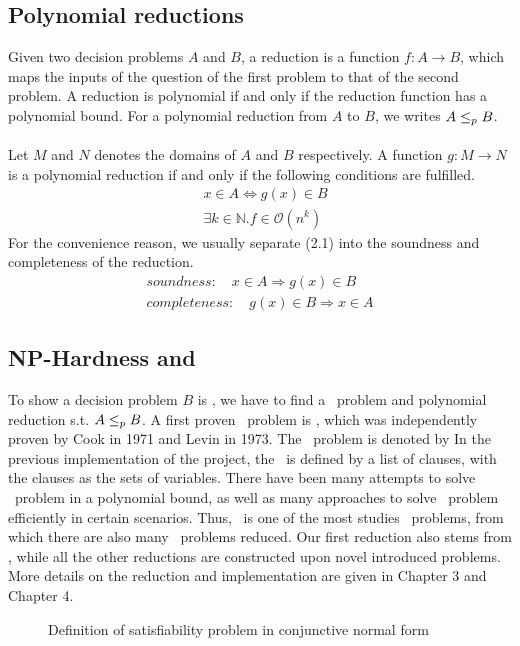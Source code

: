 \subsection{Polynomial reductions}
Given two decision problems $A$ and $B$, 
a reduction is a function $f: A \rightarrow B$, 
which maps the inputs of the question of the first problem 
to that of the second problem. A reduction is polynomial 
if and only if the reduction function has a polynomial bound. 
For a polynomial reduction from $A$ to $B$, we writes $A \leq_p B$. \\ \\
Let $M$ and $N$ denotes the domains of $A$ and $B$ respectively. 
A function $g: M \rightarrow N$ is a polynomial reduction 
if and only if the following conditions are fulfilled.
\begin{align}  
    &x \in A \iff g(x) \in B \\
    &\exists k\in \mathbb{N}. f \in \mathcal{O}(n^k)
\end{align}
For the convenience reason, we usually separate (2.1) into the soundness and completeness of the reduction.
\begin{align}
    soundness: \quad x \in A \Longrightarrow g(x) \in B \\
    completeness: \quad g(x) \in B \Longrightarrow x \in A
\end{align}

\subsection{NP-Hardness and \SAT}
To show a decision problem $B$ is \NPH, 
we have to find a \NPH\ problem and polynomial reduction 
s.t. $A \leq_p B$. A first proven \NPH\ problem is \SAT, 
which was independently proven by Cook in 1971 and Levin in 1973. 
The \SAT\ problem is denoted by 
In the previous implementation of the project, the \SAT\ is defined by a list of clauses, with the clauses as the sets of variables.
There have been many attempts to solve \SAT\ problem in a polynomial bound, 
as well as many approaches to solve \SAT\ problem efficiently in certain scenarios.
Thus, \SAT\ is one of the most studies \NPH\ problems, from which there are also many \NPH\ problems reduced. 
Our first reduction also stems from \SAT, while all the other reductions are constructed upon novel introduced problems. 
More details on the reduction and implementation are given in Chapter 3 and Chapter 4. 
\begin{figure}[!ht]
    \caption{Definition of satisfiability problem in conjunctive normal form}
\end{figure}

